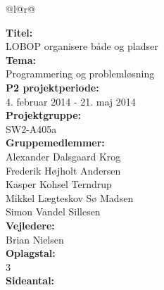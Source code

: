 \pagestyle{titlepagestyle}

\newlength{\realparindent}
\newlength{\realparskip}
\setlength{\realparindent}{\parindent}
\setlength{\realparskip}{\parskip}

\begin{nopagebreak}
{\begin{center}
    \begin{tabular*}{\textwidth}{@{}l@{\extracolsep{\fill}}r@{}}
        \\
        \begin{minipage}[t]{0.49\textwidth}
            \textbf{Titel:}\\
            LOBOP organisere både og pladser\\

            \textbf{Tema:}\\
            Programmering og problemløsning\\

            \textbf{P2 projektperiode:}\\
            4. februar 2014 - 21. maj 2014\\

            \textbf{Projektgruppe:}\\
            SW2-A405a\\

            \textbf{Gruppemedlemmer:}\\
            Alexander Dalsgaard Krog\\
            Frederik Højholt Andersen\\
            Kasper Kohsel Terndrup\\
            Mikkel Lægteskov Sø Madsen\\
            Simon Vandel Sillesen\\

            \textbf{Vejledere:}\\
            Brian Nielsen\\

            \textbf{Oplagstal:}\\
            3\\

            \textbf{Sideantal:}\\
            \numberpages\\ 


\end{minipage}
\end{tabular*}
\end{center}}
\end{nopagebreak}
